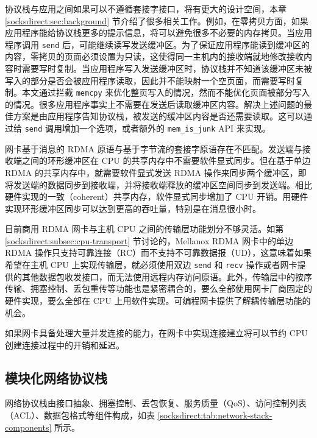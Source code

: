 协议栈与应用之间如果可以不遵循套接字接口，将有更大的设计空间，本章 \ref{socksdirect:sec:background} 节介绍了很多相关工作。例如，在零拷贝方面，如果应用程序能给协议栈更多的提示信息，将可以避免很多不必要的内存拷贝。当应用程序调用 \texttt{send} 后，可能继续读写发送缓冲区。为了保证应用程序能读到缓冲区的内容，零拷贝的页面必须设置为只读，这使得同一主机内的接收端就地修改接收内容时需要写时复制。当应用程序写入发送缓冲区时，协议栈并不知道该缓冲区未被写入的部分是否会被应用程序读取，因此并不能映射一个空页面，而需要写时复制。本文通过拦截 \texttt{memcpy} 来优化整页写入的情况，然而不能优化页面被部分写入的情况。很多应用程序事实上不需要在发送后读取缓冲区内容。解决上述问题的最佳方案是由应用程序告知协议栈，被发送的缓冲区内容是否还需要读取。这可以通过给 \texttt{send} 调用增加一个选项，或者额外的 \texttt{mem\_is\_junk} API 来实现。

网卡基于消息的 RDMA 原语与基于字节流的套接字原语存在不匹配。发送端与接收端之间的环形缓冲区在 CPU 的共享内存中不需要软件显式同步。但在基于单边 RDMA 的共享内存中，就需要软件显式发送 RDMA 操作来同步两个缓冲区，即将发送端的数据同步到接收端，并将接收端释放的缓冲区空间同步到发送端。相比硬件实现的一致（coherent）共享内存，软件显式同步增加了 CPU 开销。用硬件实现环形缓冲区同步可以达到更高的吞吐量，特别是在消息很小时。

目前商用 RDMA 网卡与主机 CPU 之间的传输层功能划分不够灵活。如第 \ref{socksdirect:subsec:cpu-transport} 节讨论的，Mellanox RDMA 网卡中的单边 RDMA 操作只支持可靠连接（RC）而不支持不可靠数据报（UD），这意味着如果希望在主机 CPU 上实现传输层，就必须使用双边 \texttt{send} 和 \texttt{recv} 操作或者网卡提供的其他数据包收发接口，而无法使用远程内存访问原语。此外，传输层中的按序传输、拥塞控制、丢包重传等功能也是紧密耦合的，要么全部使用网卡厂商固定的硬件实现，要么全部在 CPU 上用软件实现。可编程网卡提供了解耦传输层功能的机会。

如果网卡具备处理大量并发连接的能力，在网卡中实现连接建立将可以节约 CPU 创建连接过程中的开销和延迟。

\subsection{模块化网络协议栈}

网络协议栈由接口抽象、拥塞控制、丢包恢复、服务质量（QoS）、访问控制列表（ACL）、数据包格式等组件构成，如表 \ref{socksdirect:tab:network-stack-components} 所示。


